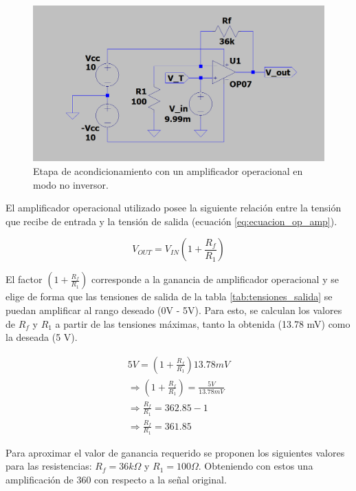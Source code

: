 \documentclass[journal,trans]{IEEEtran}
\begin{document}
\begin{figure}[hbtp]
	\centering
	\includegraphics[width = \columnwidth]{images/op_amp.PNG}
	\caption{Etapa de acondicionamiento con un amplificador operacional en modo no inversor.}
    \label{fig:op_amp}
\end{figure}

El amplificador operacional utilizado posee la siguiente relación entre la tensión que recibe de entrada y la tensión de salida (ecuación \ref{eq:ecuacion_op_amp}).

\begin{equation}
    \label {eq:ecuacion_op_amp}
    V_{OUT} = V_{IN}(1+\frac{R_{f}}{R_{1}})
\end{equation}

El factor $(1+\frac{R_{f}}{R_{1}})$ corresponde a la ganancia de amplificador operacional y se elige de forma que las tensiones de salida de la tabla \ref{tab:tensiones_salida} se puedan amplificar al rango deseado (0V - 5V). Para esto, se calculan los valores de $R_{f}$ y $R_{1}$ a partir de las tensiones máximas, tanto la obtenida (13.78 mV) como la deseada (5 V).

\begin{gather*}
    5V = (1+\frac{R_{f}}{R_{1}})13.78mV \\
    \Longrightarrow (1+\frac{R_{f}}{R_{1}}) = \frac{5 V}{13.78 mV} \\
    \Longrightarrow \frac{R_{f}}{R_{1}} = 362.85-1 \\
    \Longrightarrow \frac{R_{f}}{R_{1}} = 361.85
\end{gather*}

Para aproximar el valor de ganancia requerido se proponen los siguientes valores para las resistencias: $R_{f}=36 k\Omega$ y $R_{1}=100 \Omega$. Obteniendo con estos una amplificación de 360 con respecto a la señal original.
\end{document}
